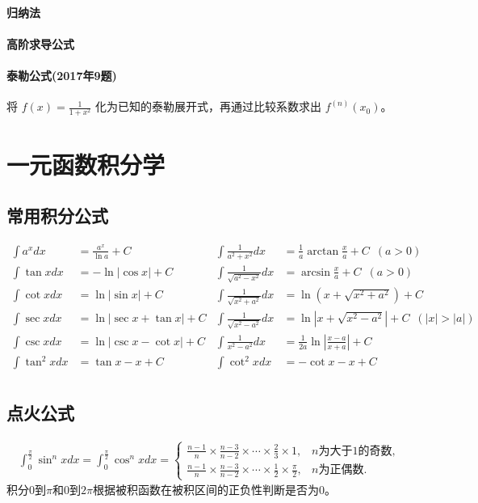 ﻿\documentclass[a4paper,12pt,UTF8]{ctexart}
\begin{document}
    \paragraph{归纳法}

    \paragraph{高阶求导公式}

    \paragraph{泰勒公式(2017年9题)}
    将 \(f(x)=\frac{1}{1+x^2}\) 化为已知的泰勒展开式，再通过比较系数求出 \(f^{(n)}(x_0)\)。

    \section{一元函数积分学}

    \subsection{常用积分公式}
    \begin{align*}
        \int {a}^{x} dx& = \frac{{a}^{x}}{\ln a}+C& \int \frac{1}{a^{2}+x^{2}}dx& = \frac{1}{a}\arctan\frac{x}{a}+C \enspace (a>0)&\\
        \int \tan x dx& = -\ln \left|\cos x \right|+C& \int \frac{1}{\sqrt{a^{2}-x^{2}}}dx& = \arcsin\frac{x}{a}+C \enspace (a>0)&\\
        \int \cot x dx& = \ln \left|\sin x \right|+C& \int \frac{1}{\sqrt{x^{2}+a^{2}}}dx& = \ln\left(x+\sqrt{x^{2}+a^{2}}\right)+C&\\
        \int \sec x dx& = \ln \left|\sec x + \tan x \right|+C& \int \frac{1}{\sqrt{x^{2}-a^{2}}}dx& = \ln\left|x+\sqrt{x^{2}-a^{2}}\right|+C \enspace (\left|x\right|>\left|a\right|)&\\
        \int \csc x dx& = \ln \left|\csc x - \cot x \right|+C& \int \frac{1}{x^{2}-a^{2}}dx& = \frac{1}{2a}\ln\left|\frac{x-a}{x+a}\right|+C&\\
        \int \tan^2 x dx& = \tan x-x+C& \int \cot^2 x dx& = -\cot x-x+C& \\
    \end{align*}
    
    \subsection{点火公式}
    \begin{align*}
        \int_{0}^{\frac{\pi}{2}} \sin^{n}x dx = \int_{0}^{\frac{\pi}{2}} \cos^{n}x dx =
        \begin{cases}
            \frac{n-1}{n} \times \frac{n-3}{n-2} \times \cdots \times \frac{2}{3} \times 1,& n \text{为大于} 1 \text{的奇数},\\
            \frac{n-1}{n} \times \frac{n-3}{n-2} \times \cdots \times \frac{1}{2} \times \frac{\pi}{2},& n \text{为正偶数}.
        \end{cases}
    \end{align*}
    积分0到\(\pi\)和0到\(2\pi\)根据被积函数在被积区间的正负性判断是否为0。
\end{document}
